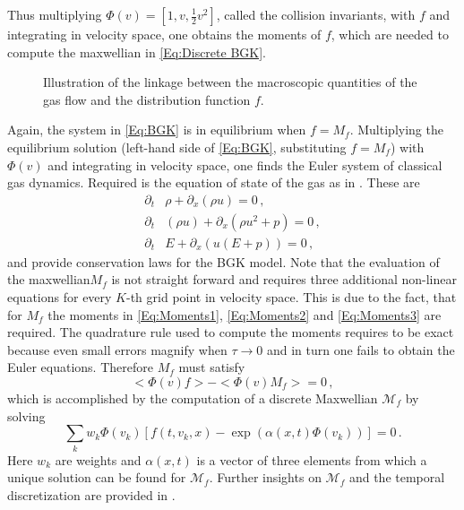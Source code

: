 Thus multiplying \(\Phi(v) = [1,v,\frac{1}{2} v^2]\), called the collision invariants, with \(f\) and integrating in velocity space, one obtains the moments of \(f\), which are needed to compute the maxwellian in \cref{Eq:Discrete BGK}.
\begin{wrapfigure}{r}{0.5\textwidth}
	\vspace{-10pt}
	
	\caption{Illustration of the linkage between the macroscopic quantities of the gas flow and the distribution function \(f\).}
	\vspace{-30pt}
	\label{Fig:Demo Macro}
\end{wrapfigure}
Again, the system in \cref{Eq:BGK} is in equilibrium when \(f = M_f\). Multiplying the equilibrium solution (left-hand side of \cref{Eq:BGK}, substituting \(f=M_f\)) with \(\Phi(v)\) and integrating in velocity space, one finds the Euler system of classical gas dynamics. Required is the equation of state of the gas as in \cite{puppo2019kinetic}. These are
\begin{align}
	\partial_t&\rho + \partial_x(\rho u) = 0 \,, \label{Eq:Conservation1} \\
	\partial_t&(\rho u) + \partial_x(\rho u^2 + p) = 0 \,, \label{Eq:Conservation2}\\
	\partial_t&E + \partial_x(u(E+p)) = 0\,, \label{Eq:Conservation3}
\end{align}
and provide conservation laws for the BGK model. Note that the evaluation of the maxwellian\(M_f\) is not straight forward and requires three additional non-linear equations for every \(K\)-th grid point in velocity space. This is due to the fact, that for \(M_f\) the moments in \cref{Eq:Moments1}, \cref{Eq:Moments2} and \cref{Eq:Moments3} are required. The quadrature rule used to compute the moments requires to be exact because even small errors magnify when \(\tau \rightarrow 0\) and in turn one fails to obtain the Euler equations. Therefore \(M_f\) must satisfy  
\begin{equation}
	<\Phi(v)f> - <\Phi(v)M_f> = 0\,,
\end{equation}
which is accomplished by the computation of a discrete Maxwellian \(\mathcal{M}_f\) by solving
\begin{equation}
	\sum_k w_k \Phi(v_k) [f(t,v_k,x) - \exp(\alpha(x,t)\Phi(v_k))] = 0\,.
\end{equation}
Here \(w_k\) are weights and \(\alpha(x,t)\) is a vector of three elements from which a unique solution can be found for \(\mathcal{M}_f\). Further insights on \(\mathcal{M}_f\) and the temporal discretization are provided in \cite{puppo2019kinetic}.\\

